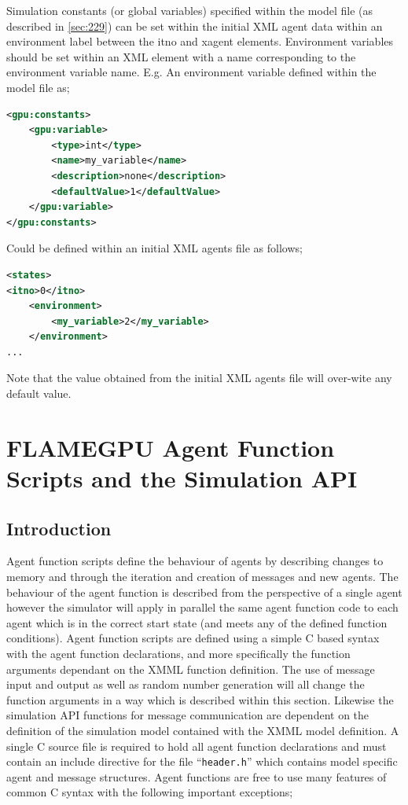 \documentclass[11pt, a4paper, onecolumn, oneside]{report}
\begin{document}
Simulation constants (or global variables) specified within the model file (as described in \cref{sec:229}) can be set within the initial XML agent data within an environment label between the itno and xagent elements. Environment variables should be set within an XML element with a name corresponding to the environment variable name. E.g. An environment variable defined within the model file as;

\begin{lstlisting}[language=XML]
<gpu:constants>
    <gpu:variable>
        <type>int</type>
        <name>my_variable</name>
        <description>none</description>
        <defaultValue>1</defaultValue>
    </gpu:variable>
</gpu:constants>
\end{lstlisting}

Could be defined within an initial XML agents file as follows;

\begin{lstlisting}[language=XML]
<states>
<itno>0</itno>
    <environment>
        <my_variable>2</my_variable>
    </environment>
...
\end{lstlisting}

Note that the value obtained from the initial XML agents file will over-wite any default value.

\chapter{FLAMEGPU Agent Function Scripts and the Simulation API}
\label{ch:3}
\section{Introduction}
\label{sec:31}



Agent function scripts define the behaviour of agents by describing changes to memory and through the iteration and creation of messages and new agents.
The behaviour of the agent function is described from the perspective of a single agent however the simulator will apply in parallel the same agent function code to each agent which is in the correct start state (and meets any of the defined function conditions).
Agent function scripts are defined using a simple C based syntax with the agent function declarations, and more specifically the function arguments dependant on the XMML function definition.
The use of message input and output as well as random number generation will all change the function arguments in a way which is described within this section.
Likewise the simulation API functions for message communication are dependent on the definition of the simulation model contained with the XMML model definition.
A single C source file is required to hold all agent function declarations and must contain an include directive for the file ``\texttt{header.h}'' which contains model specific agent and message structures.
Agent functions are free to use many features of common C syntax with the following important exceptions; 
\end{document}
